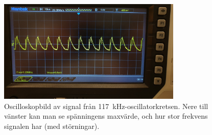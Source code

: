 \documentclass[a4paper]{article}
\begin{document}
\begin{sloppypar}
    \begin{figure}[H]
        \centering
        \includegraphics[width = 0.78\textwidth]{signal-555-117kHz.jpg}
        \caption{Oscilloskopbild av signal från 117~kHz-oscillatorkretsen. Nere till vänster kan man se spänningens maxvärde, och hur stor frekvens signalen har (med störningar).}
        \label{fig:signal-117kHz}
    \end{figure}



\end{sloppypar}
\end{document}
